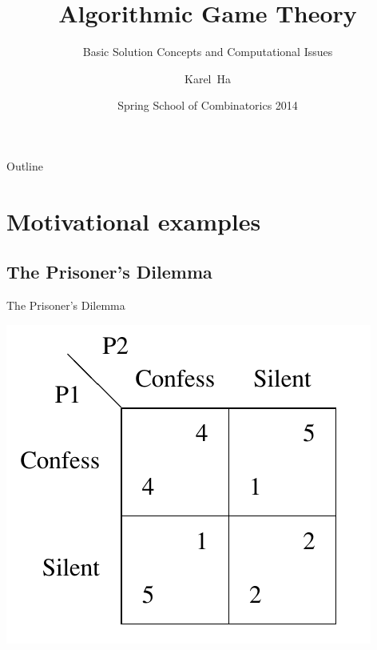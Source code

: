 \documentclass{beamer}
\title{Algorithmic Game Theory}
\subtitle{Basic Solution Concepts and Computational Issues}
\author{Karel~Ha}
\date{Spring School of Combinatorics 2014}
\begin{document}
\begin{frame}
  \titlepage
\end{frame}

\begin{frame}{Outline}
  \tableofcontents[pausesections]
\end{frame}

\section{Motivational examples}

\subsection{The Prisoner's Dilemma}


\begin{frame}{The Prisoner's Dilemma}
  \begin{center}
    \includegraphics[width=\textwidth,height=0.8\textheight,keepaspectratio]{img/prisoner.png}
  \end{center}
\end{frame}
\end{document}
